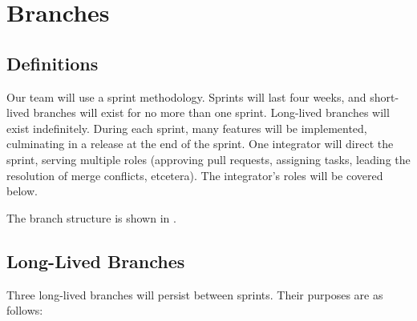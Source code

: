 \section{Branches} \label{section: branches}

\subsection{Definitions}

Our team will use a sprint methodology.
Sprints will last four weeks, and short-lived branches will exist for no more than one sprint.
Long-lived branches will exist indefinitely.
During each sprint, many features will be implemented, culminating in a release at the end of the sprint.
One integrator will direct the sprint, serving multiple roles (approving pull requests, assigning tasks, leading the resolution of merge conflicts, etcetera).
The integrator’s roles will be covered below.

The branch structure is shown in .

 \subsection{Long-Lived Branches}

 Three long-lived branches will persist between sprints. Their purposes are as follows:

